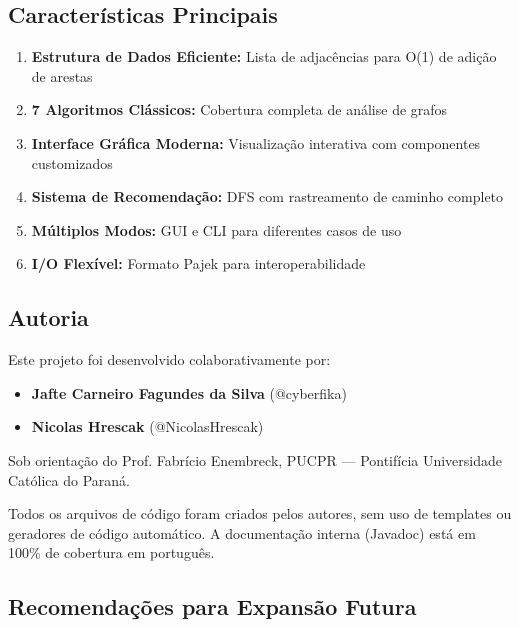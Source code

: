 \documentclass[12pt,a4paper]{article}
\begin{document}
    \subsection{Características Principais}

    \begin{enumerate}
        \item \textbf{Estrutura de Dados Eficiente:} Lista de adjacências para O(1) de adição de arestas
        \item \textbf{7 Algoritmos Clássicos:} Cobertura completa de análise de grafos
        \item \textbf{Interface Gráfica Moderna:} Visualização interativa com componentes customizados
        \item \textbf{Sistema de Recomendação:} DFS com rastreamento de caminho completo
        \item \textbf{Múltiplos Modos:} GUI e CLI para diferentes casos de uso
        \item \textbf{I/O Flexível:} Formato Pajek para interoperabilidade
    \end{enumerate}

    \subsection{Autoria}

    Este projeto foi desenvolvido colaborativamente por:

    \begin{itemize}
        \item \textbf{Jafte Carneiro Fagundes da Silva} (@cyberfika)
        \item \textbf{Nicolas Hrescak} (@NicolasHrescak)
    \end{itemize}

    Sob orientação do Prof. Fabrício Enembreck, PUCPR — Pontifícia Universidade Católica do Paraná.

    Todos os arquivos de código foram criados pelos autores, sem uso de templates ou geradores de código automático. A documentação interna (Javadoc) está em 100\% de cobertura em português.

    \subsection{Recomendações para Expansão Futura}
\end{document}
